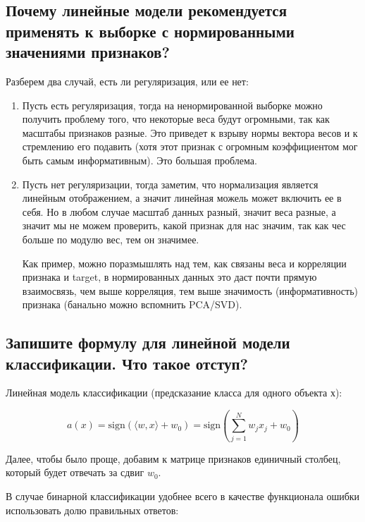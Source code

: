 \subsection{Почему линейные модели рекомендуется применять к выборке с нормированными значениями признаков?}

Разберем два случай, есть ли регуляризация, или ее нет:
\begin{enumerate}
    \item Пусть есть регуляризация, тогда на ненормированной выборке можно получить проблему того, что некоторые веса будут огромными, так как масштабы признаков разные. Это приведет к взрыву нормы вектора весов и к стремлению его подавить (хотя этот признак с огромным коэффициентом мог быть самым информативным). Это большая проблема.
    \item Пусть нет регуляризации, тогда заметим, что нормализация является линейным отображением, а значит линейная можель может включить ее в себя. Но в любом случае масштаб данных разный, значит веса разные, а значит мы не можем проверить, какой признак для нас значим, так как чес больше по модулю вес, тем он значимее. 
    
    Как пример, можно поразмышлять над тем, как связаны веса и корреляции признака и target, в нормированных данных это даст почти прямую взаимосвязь, чем выше корреляция, тем выше значимость (информативность) признака (банально можно вспомнить PCA/SVD).
\end{enumerate}











\subsection{Запишите формулу для линейной модели классификации. Что такое отступ?}

Линейная модель классификации (предсказание класса для одного объекта х):

$$a(x) = \text{sign}(\langle w, x\rangle + w_0) = \text{sign}\left(\sum\limits_{j=1}^Nw_jx_j + w_0\right)$$

Далее, чтобы было проще,  добавим к матрице признаков единичный столбец, который будет отвечать за сдвиг $w_0$.

В случае бинарной классификации удобнее всего в качестве функционала ошибки использовать долю правильных ответов:

